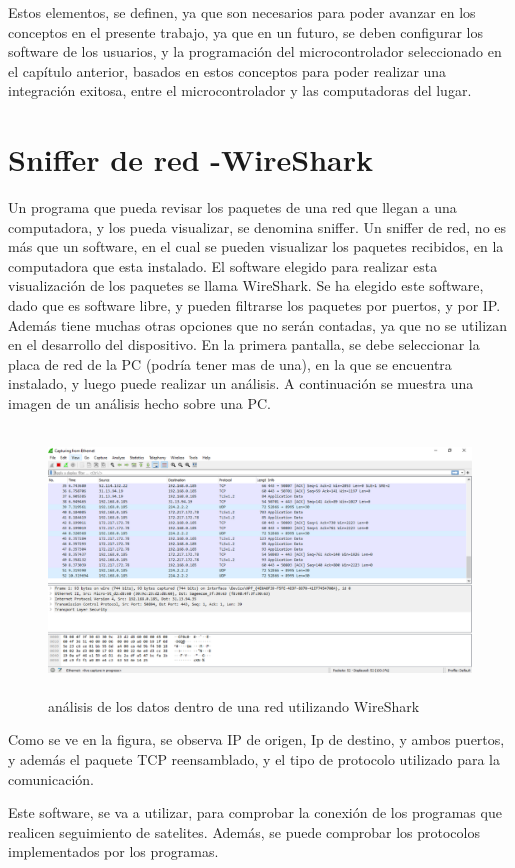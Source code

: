 	Estos elementos, se definen, ya que son necesarios para poder avanzar en los conceptos en el presente trabajo, ya que en un futuro, se deben configurar los software de los usuarios, y la programación del microcontrolador seleccionado en el capítulo anterior, basados en estos conceptos para poder realizar una integración exitosa, entre el microcontrolador y las computadoras del lugar. 
	
\section{Sniffer de red -WireShark} 

Un programa que pueda revisar los paquetes de una red que llegan a una computadora, y los pueda visualizar, se denomina sniffer. Un sniffer de red, no es más que un software, en el cual se pueden visualizar los paquetes recibidos, en la computadora que esta instalado. El software elegido para realizar esta visualización de los paquetes se llama WireShark. Se ha elegido este software, dado que es software libre, y pueden filtrarse los paquetes por puertos, y por IP. Además tiene muchas otras opciones que no serán contadas, ya que no se utilizan en el desarrollo del dispositivo. En la primera pantalla, se debe seleccionar la placa de red de la PC (podría tener mas de una), en la que se encuentra instalado, y luego puede realizar un análisis. A continuación se muestra una imagen de un análisis hecho sobre una PC.
\begin{figure}[H]
	\centering 
	\includegraphics[height=7cm]{wireshark}
	\caption{análisis de los datos dentro de una red utilizando WireShark}
\end{figure}


Como se ve en la figura, se observa IP de origen, Ip de destino, y ambos puertos, y además el paquete TCP reensamblado, y el tipo de protocolo utilizado para la comunicación.  

Este software, se va a utilizar, para comprobar la conexión de los programas que realicen seguimiento de satelites. Además, se puede comprobar los protocolos implementados por los programas. 

